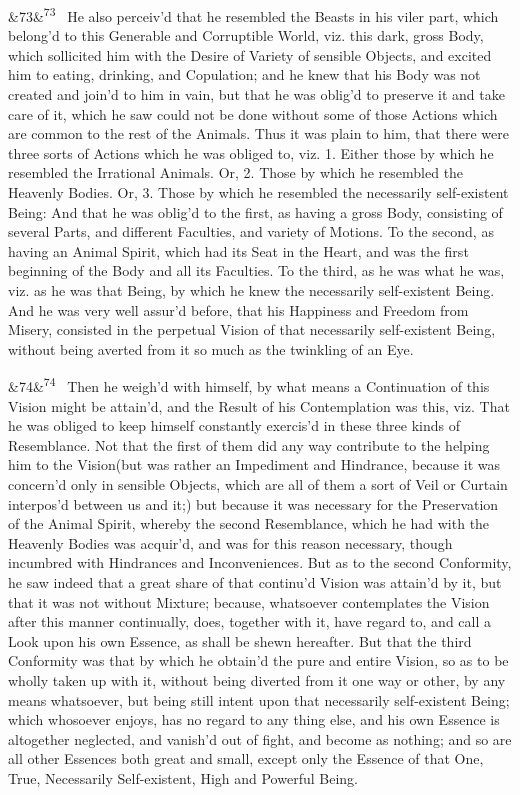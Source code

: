\documentclass[12pt]{article}
\newcommand{\para}[1][]{\par\noindent\ifx&#1&\else\textsuperscript{\footnotesize #1}~\fi}
\begin{document}
\para[73] He also perceiv'd that he resembled the Beasts in his viler part, which belong'd to this Generable and Corruptible World, viz. this dark, gross Body, which sollicited him with the Desire of Variety of sensible Objects, and excited him to eating, drinking, and Copulation; and he knew that his Body was not created and join'd to him in vain, but that he was oblig'd to preserve it and take care of it, which he saw could not be done without some of those Actions which are common to the rest of the Animals. Thus it was plain to him, that there were three sorts of Actions which he was obliged to, viz. 1. Either those by which he resembled the Irrational Animals. Or, 2. Those by which he resembled the Heavenly Bodies. Or, 3. Those by which he resembled the necessarily self-existent Being: And that he was oblig'd to the first, as having a gross Body, consisting of several Parts, and different Faculties, and variety of Motions. To the second, as having an Animal Spirit, which had its Seat in the Heart, and was the first beginning of the Body and all its Faculties. To the third, as he was what he was, viz. as he was that Being, by which he knew the necessarily self-existent Being. And he was very well assur'd before, that his Happiness and Freedom from Misery, consisted in the perpetual Vision of that necessarily self-existent Being, without being averted from it so much as the twinkling of an Eye.

\para[74] Then he weigh'd with himself, by what means a Continuation of this Vision might be attain'd, and the Result of his Contemplation was this, viz. That he was obliged to keep himself constantly exercis'd in these three kinds of Resemblance. Not that the first of them did any way contribute to the helping him to the Vision(but was rather an Impediment and Hindrance, because it was concern'd only in sensible Objects, which are all of them a sort of Veil or Curtain interpos'd between us and it;) but because it was necessary for the Preservation of the Animal Spirit, whereby the second Resemblance, which he had with the Heavenly Bodies was acquir'd, and was for this reason necessary, though incumbred with Hindrances and Inconveniences. But as to the second Conformity, he saw indeed that a great share of that continu'd Vision was attain'd by it, but that it was not without Mixture; because, whatsoever contemplates the Vision after this manner continually, does, together with it, have regard to, and call a Look upon his own Essence, as shall be shewn hereafter. But that the third Conformity was that by which he obtain'd the pure and entire Vision, so as to be wholly taken up with it, without being diverted from it one way or other, by any means whatsoever, but being still intent upon that necessarily self-existent Being; which whosoever enjoys, has no regard to any thing else, and his own Essence is altogether neglected, and vanish'd out of fight, and become as nothing; and so are all other Essences both great and small, except only the Essence of that One, True, Necessarily Self-existent, High and Powerful Being.
\end{document}
